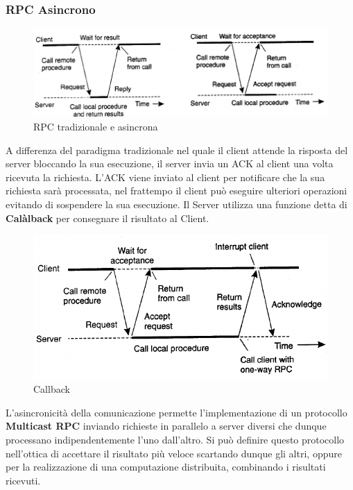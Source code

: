\documentclass[12pt]{article}
\begin{document}
		\subsubsection{RPC Asincrono}
			\begin{figure}[h!]
				\centering
				\includegraphics[scale=0.45]{img/async.png}
				\caption{RPC tradizionale e asincrona }
			\end{figure}
			A differenza del paradigma tradizionale nel quale il client attende la risposta del server bloccando la sua esecuzione, il server invia un ACK al client una volta ricevuta la richiesta. L'ACK viene inviato al client per notificare che la sua richiesta sarà processata, nel frattempo il client può eseguire ulteriori operazioni evitando di sospendere la sua esecuzione. Il Server utilizza una funzione detta di \textbf{Calàlback} per consegnare il risultato al Client.
			\begin{figure}[h!]
				\centering
				\includegraphics[scale=0.40]{img/callback.png}
				\caption{Callback }
			\end{figure}
			L'asincronicità della comunicazione permette l'implementazione di un protocollo \textbf{Multicast RPC} inviando richieste in parallelo a server diversi che dunque processano indipendentemente l'uno dall'altro. Si può definire questo protocollo nell'ottica di accettare il risultato più veloce scartando dunque gli altri, oppure per la realizzazione di una computazione distribuita, combinando i risultati ricevuti.
			
\end{document}
